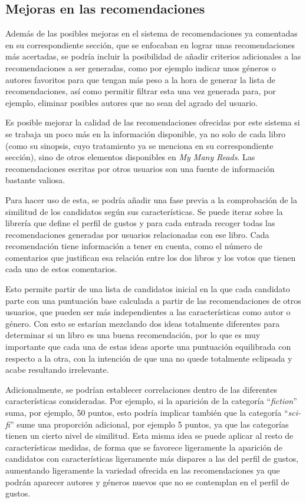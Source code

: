 \subsection{Mejoras en las recomendaciones}
\label{mejoras en las recomendaciones}

Además de las posibles mejoras en el sistema de recomendaciones ya comentadas en su correspondiente sección, que se enfocaban en lograr unas recomendaciones más acertadas, se podría incluir la posibilidad de añadir criterios adicionales a las recomendaciones a ser generadas, como por ejemplo indicar unos géneros o autores favoritos para que tengan más peso a la hora de generar la lista de recomendaciones, así como permitir filtrar esta una vez generada para, por ejemplo, eliminar posibles autores que no sean del agrado del usuario.

Es posible mejorar la calidad de las recomendaciones ofrecidas por este sistema si se trabaja un poco más en la información disponible, ya no solo de cada libro (como su sinopsis, cuyo tratamiento ya se menciona en su correspondiente sección), sino de otros elementos disponibles en \textit{My Many Reads}. Las recomendaciones escritas por otros usuarios son una fuente de información bastante valiosa.

Para hacer uso de esta, se podría añadir una fase previa a la comprobación de la similitud de los candidatos según sus características. Se puede iterar sobre la librería que define el perfil de gustos y para cada entrada recoger todas las recomendaciones generadas por usuarios relacionadas con ese libro. Cada recomendación tiene información a tener en cuenta, como el número de comentarios que justifican esa relación entre los dos libros y los votos que tienen cada uno de estos comentarios.

Esto permite partir de una lista de candidatos inicial en la que cada candidato parte con una puntuación base calculada a partir de las recomendaciones de otros usuarios, que pueden ser más independientes a las características como autor o género. Con esto se estarían mezclando dos ideas totalmente diferentes para determinar si un libro es una buena recomendación, por lo que es muy importante que cada una de estas ideas aporte una puntuación equilibrada con respecto a la otra, con la intención de que una no quede totalmente eclipsada y acabe resultando irrelevante.

Adicionalmente, se podrían establecer correlaciones dentro de las diferentes características consideradas. Por ejemplo, si la aparición de la categoría ``\textit{fiction}'' suma, por ejemplo, 50 puntos, esto podría implicar también que la categoría ``\textit{sci-fi}'' sume una proporción adicional, por ejemplo 5 puntos, ya que las categorías tienen un cierto nivel de similitud. Esta misma idea se puede aplicar al resto de características medidas, de forma que se favorece ligeramente la aparición de candidatos con características ligeramente más dispares a las del perfil de gustos, aumentando ligeramente la variedad ofrecida en las recomendaciones ya que podrán aparecer autores y géneros nuevos que no se contemplan en el perfil de gustos.

